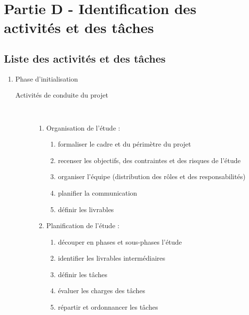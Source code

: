 \chapter*{Partie D - Identification des activités et des tâches}

\section*{Liste des activités et des tâches}


\begin{enumerate}
  \item Phase d'initialisation
    \begin{description}

      \item[Activités de conduite du projet] \hfill \\
          \begin{enumerate}
            \item Organisation de l'étude :
              \begin{enumerate}
                  \item formaliser le cadre et du périmètre du projet 
                  \item  recenser les objectifs, des contraintes et des risques de l'étude 
                  \item  organiser l'équipe (distribution des rôles et des responsabilités) 
                  \item  planifier la communication 
                  \item  définir les livrables 
              \end{enumerate}
            \item Planification de l'étude : 
              \begin{enumerate}
                  \item  découper en phases et sous-phases l'étude 
                  \item  identifier les livrables intermédiaires 
                  \item  définir les tâches 
                  \item  évaluer les charges des tâches 
                  \item  répartir et ordonnancer les tâches 
              \end{enumerate}
          \end{enumerate}


\end{description}
\end{enumerate}
